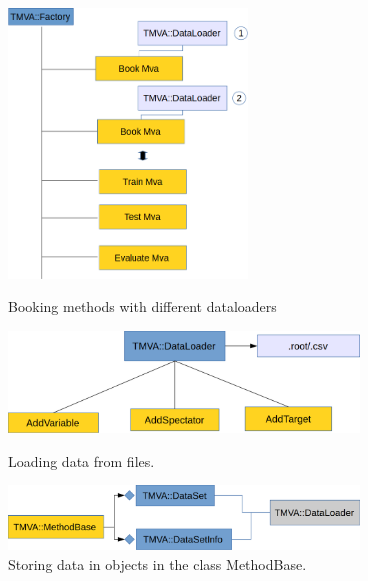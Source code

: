 \documentclass[a4paper]{jpconf}
\begin{document}
\begin{figure}[h]
\begin{minipage}{15pc}
\includegraphics[width=15pc]{img/dl1.png}
\caption{\label{dl1}Booking methods with different dataloaders}
\end{minipage}\hspace{2pc}%
\begin{minipage}{15pc}
\includegraphics[width=22pc]{img/dl2.png}
\caption{\label{dl2}Loading data from files.}\vspace{4pc}%
\includegraphics[width=22pc]{img/dl3.png}
\caption{\label{dl3}Storing data in objects in the class MethodBase.}
\end{minipage} 
\end{figure}
\end{document}
